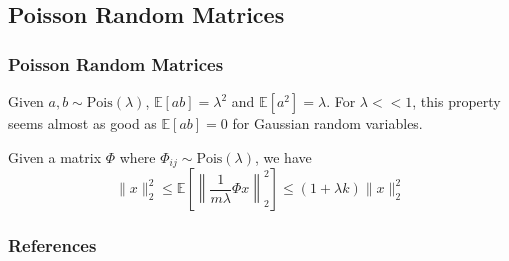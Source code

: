 \documentclass[aspectratio=34]{beamer}
\begin{document}
\subsection{Poisson Random Matrices}
\begin{frame}
    \frametitle{Poisson Random Matrices}
    Given $a,b \sim \text{Pois}(\lambda)$, $\mathbb{E}[ab] = \lambda^2$ and $\mathbb{E}[a^2] = \lambda$.
    For $\lambda << 1$, this property seems almost as good as $\mathbb{E}[ab] = 0$ for Gaussian random variables. 
    
    \begin{Lemma}
    	
    Given a matrix $\Phi$ where $\Phi_{ij} \sim \text{Pois}(\lambda)$, we have
    \[\|x\|_2^2 \le \mathbb{E}\left[\left\|\frac{1}{m\lambda}\Phi x\right\|_2^2\right] \le (1+\lambda k)\|x\|_2^2\]	
    \end{Lemma}

\end{frame}

\begin{frame}[t,allowframebreaks]{}
\frametitle{References}



\end{frame}
\end{document}

